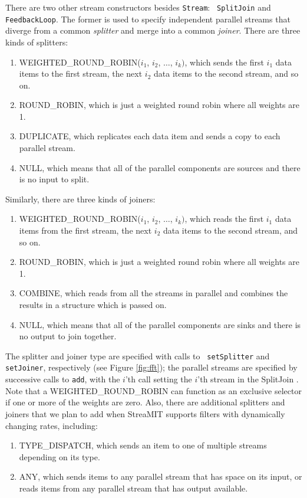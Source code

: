 There are two other stream constructors besides {\tt Stream}: {\tt
SplitJoin} and {\tt FeedbackLoop}.  The former is used to specify
independent parallel streams that diverge from a common {\it splitter}
and merge into a common {\it joiner}.  There are three kinds of
splitters:
\begin{enumerate}
\item WEIGHTED\_ROUND\_ROBIN($i_1$, $i_2$, $\dots$, $i_k)$,
which sends the first $i_1$ data items to the first stream, the next
$i_2$ data items to the second stream, and so on.
\item ROUND\_ROBIN, which is just a weighted round robin where all
weights are 1.
\item DUPLICATE, which replicates each data item and sends a copy to each
parallel stream.
\item NULL, which means that all of the parallel components are
sources and there is no input to split.
\end{enumerate}
Similarly, there are three kinds of joiners: 
\begin{enumerate}
\item WEIGHTED\_ROUND\_ROBIN($i_1$, $i_2$, $\dots$, $i_k)$, which reads the
first $i_1$ data items from the first stream, the next $i_2$ data
items to the second stream, and so on.
\item ROUND\_ROBIN, which is just a weighted round robin where all
weights are 1.
\item COMBINE, which reads from all the streams in parallel and
combines the results in a structure which is passed on.
\item NULL, which means that all of the parallel components are sinks
and there is no output to join together.
\end{enumerate}
The splitter and joiner type are specified with calls to {\tt
setSplitter} and {\tt setJoiner}, respectively (see Figure
\ref{fig:fft}); the parallel streams are specified by successive calls
to {\tt add}, with the $i$'th call setting the $i$'th stream in the
SplitJoin .  Note that a WEIGHTED\_ROUND\_ROBIN can function as an
exclusive selector if one or more of the weights are zero.  Also,
there are additional splitters and joiners that we plan to add when
StreaMIT supports filters with dynamically changing rates, including:
\begin{enumerate}
\item TYPE\_DISPATCH, which sends an item to one of multiple streams
depending on its type.
\item ANY, which sends items to any parallel stream that has space on
its input, or reads items from any parallel stream that has output
available.
\end{enumerate}

